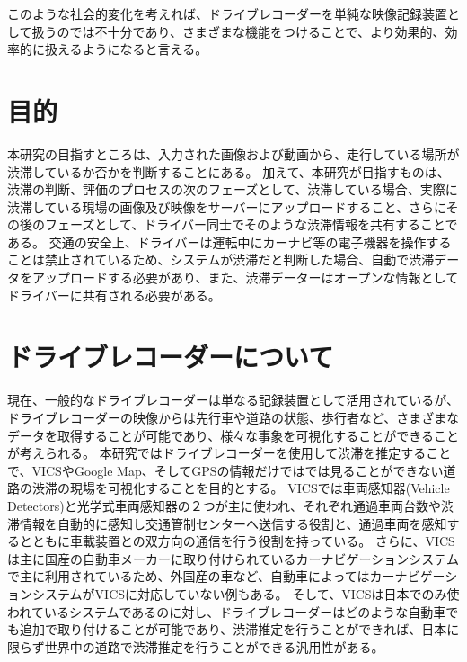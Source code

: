 このような社会的変化を考えれば、ドライブレコーダーを単純な映像記録装置として扱うのでは不十分であり、さまざまな機能をつけることで、より効果的、効率的に扱えるようになると言える。

\section{目的}
本研究の目指すところは、入力された画像および動画から、走行している場所が渋滞しているか否かを判断することにある。
加えて、本研究が目指すものは、渋滞の判断、評価のプロセスの次のフェーズとして、渋滞している場合、実際に渋滞している現場の画像及び映像をサーバーにアップロードすること、さらにその後のフェーズとして、ドライバー同士でそのような渋滞情報を共有することである。
交通の安全上、ドライバーは運転中にカーナビ等の電子機器を操作することは禁止されているため、システムが渋滞だと判断した場合、自動で渋滞データをアップロードする必要があり、また、渋滞データーはオープンな情報としてドライバーに共有される必要がある。

\section{ドライブレコーダーについて}
現在、一般的なドライブレコーダーは単なる記録装置として活用されているが、ドライブレコーダーの映像からは先行車や道路の状態、歩行者など、さまざまなデータを取得することが可能であり、様々な事象を可視化することができることが考えられる。
本研究ではドライブレコーダーを使用して渋滞を推定することで、VICSやGoogle Map、そしてGPSの情報だけではでは見ることができない道路の渋滞の現場を可視化することを目的とする。
VICSでは車両感知器(Vehicle Detectors)と光学式車両感知器の２つが主に使われ、それぞれ通過車両台数や渋滞情報を自動的に感知し交通管制センターへ送信する役割と、通過車両を感知するとともに車載装置との双方向の通信を行う役割を持っている。
さらに、VICSは主に国産の自動車メーカーに取り付けられているカーナビゲーションシステムで主に利用されているため、外国産の車など、自動車によってはカーナビゲーションシステムがVICSに対応していない例もある。
そして、VICSは日本でのみ使われているシステムであるのに対し、ドライブレコーダーはどのような自動車でも追加で取り付けることが可能であり、渋滞推定を行うことができれば、日本に限らず世界中の道路で渋滞推定を行うことができる汎用性がある。



